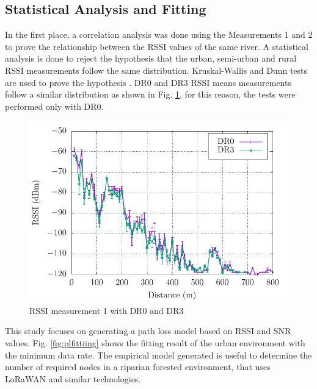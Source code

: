 \subsection{Statistical Analysis and Fitting}
\label{sub:statistical}
In the first place, a correlation analysis was done using the Measurements $1$ and $2$ to prove the relationship between the RSSI values of the same river.
A statistical analysis is done to reject the hypothesis that the urban, semi-urban and rural RSSI measurements follow the same distribution. Kruskal-Wallis and Dunn tests are used to prove the hypothesis \cite{Mendenhall2010}. DR$0$ and DR$3$ RSSI means measurements follow a similar distribution as shown in Fig. \ref{fig:rssimeasurement}, for this reason, the tests were performed only with DR$0$.

\begin{figure}[!htb]
  \centering
  \includegraphics[width=\columnwidth]{Figure4}
  \caption{RSSI measurement 1 with DR$0$ and DR$3$}
  \label{fig:rssimeasurement}
\end{figure}

This study focuses on generating a path loss model based on RSSI and SNR values. Fig. \ref{fig:plfittiing} shows the fitting result of the urban environment with the minimum data rate. The empirical model generated is useful to determine the number of required nodes in a riparian forested environment, that uses LoRaWAN and similar technologies.

